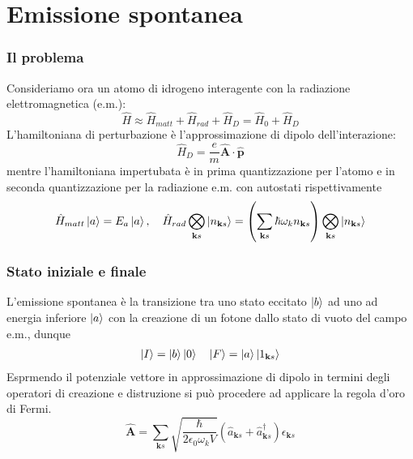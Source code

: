 \documentclass{beamer}
\begin{document}
\section{Emissione spontanea}
\begin{frame}
  \frametitle{Il problema}
  Consideriamo ora un atomo di idrogeno interagente con la radiazione elettromagnetica (e.m.):
  \begin{equation*}
    \hat{H} \approx \hat{H}_{matt} + \hat{H}_{rad} + \hat{H}_D = \hat{H}_0 + \hat{H}_D
  \end{equation*}
  L'hamiltoniana di perturbazione è l'approssimazione di dipolo dell'interazione:
  \begin{equation*}
    \hat{H}_D = \frac{e}{m} \hat{\mathbf{A}} \cdot \hat{\mathbf{p}}
  \end{equation*}
  mentre l'hamiltoniana impertubata è in prima quantizzazione per l'atomo e in seconda quantizzazione per la radiazione e.m. con autostati rispettivamente
  \begin{gather*}
    \hat{H}_{matt}\ket{a} = E_a \ket{a}, \quad \hat{H}_{rad}\bigotimes_{\mathbf{k}s} \ket{n_{\mathbf{k}s}} =
    \left(\sum_{\mathbf{k}s}\hbar\omega_{k}n_{\mathbf{k}s} \right) \bigotimes_{\mathbf{k}s} \ket{n_{\mathbf{k}s}}
  \end{gather*}
\end{frame}

\begin{frame}
  \frametitle{Stato iniziale e finale}
  L'emissione spontanea è la transizione tra uno stato eccitato $\ket{b}$ ad uno ad energia inferiore $\ket{a}$ con la creazione di un fotone dallo stato di vuoto del campo e.m., dunque
  \begin{gather*}
    \ket{I} = \ket{b}\ket{0} \quad
    \ket{F} = \ket{a}\ket{1_{\mathbf{k}s}}
  \end{gather*}
  Esprmendo il potenziale vettore in approssimazione di dipolo in termini degli operatori di creazione e distruzione si può procedere ad applicare la regola d'oro di Fermi.
  \begin{equation*}
    \hat{\mathbf{A}} = \sum_{\mathbf{k}s} \sqrt{\frac{\hbar}{2\epsilon_0\omega_kV}} \left(\hat{a}_{\mathbf{k}s} + \hat{a}_{\mathbf{k}s}^\dagger \right) \epsilon_{\mathbf{k}s}
  \end{equation*}
\end{frame}
\end{document}
